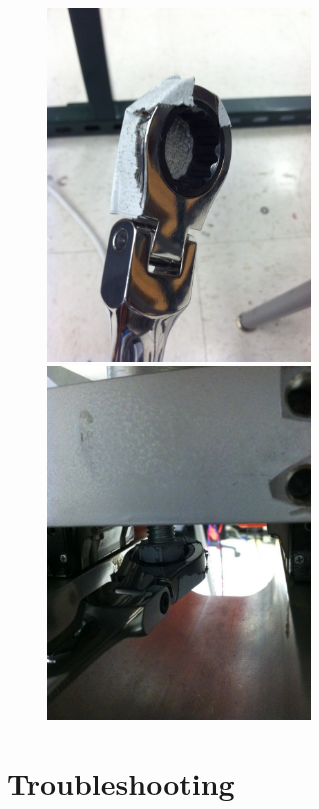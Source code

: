 \documentclass[11pt]{article}
\begin{document}
\begin{figure}[h]
\begin{center}
\includegraphics[width = 2.75in]{photoAlign1.JPG}
\includegraphics[width = 2.75in]{photoAlignTwo.JPG}
\caption{}  
\label{figAlign}
\end{center}
\end{figure}


\section{Troubleshooting}
\end{document}
